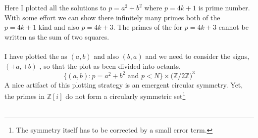 \documentclass[12pt]{article}
\begin{document}
\noindent Here I plotted all the solutions to $p = a^2 + b^2$ where $p = 4k+1$ is prime number.  With some effort we can show there infinitely many primes both of the $p =4k+1$ kind and also $p = 4k+3$.  The primes of the for $p = 4k+3$ cannot be written as the sum of two squares. \\ \\
I have plotted the as $(a,b)$ and also $(b,a)$ and we need to consider the signs, $(\pm a,\pm b)$ , so that the plot as been divided into octants. 
$$  \{ (a,b) : p = a^2 + b^2 \text{ and } p < N \} \times \big( \mathbb{Z}/2\mathbb{Z}\big)^3 $$
A nice artifact of this plotting strategy is an emergent circular symmetry.  Yet, the primes in $\mathbb{Z}[i]$ do not form a circularly symmetric set\footnote{The symmetry itself has to be corrected by a small error term.} \\ \\
 
\vspace{-24pt}
\end{document}
